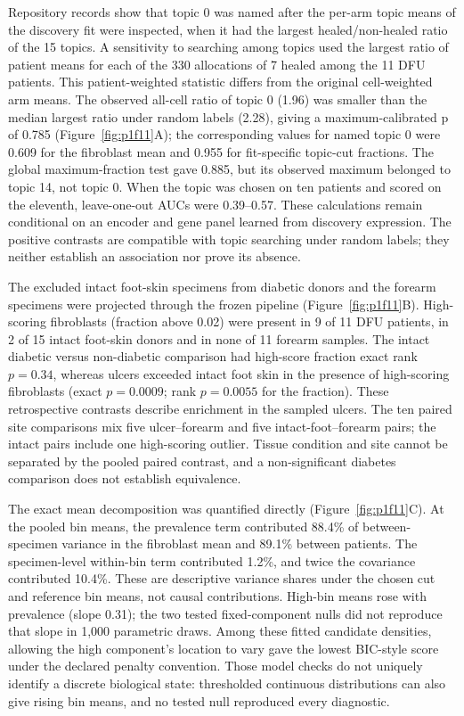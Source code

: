 \documentclass[10pt,a4paper]{article}
\begin{document}
Repository records show that topic 0 was named after the per-arm topic means of the discovery fit were inspected, when it had the largest healed/non-healed ratio of the 15 topics. A sensitivity to searching among topics used the largest ratio of patient means for each of the 330 allocations of 7 healed among the 11 DFU patients. This patient-weighted statistic differs from the original cell-weighted arm means. The observed all-cell ratio of topic 0 (1.96) was smaller than the median largest ratio under random labels (2.28), giving a maximum-calibrated p of 0.785 (Figure~\ref{fig:p1f11}A\label{call:p1f11}); the corresponding values for named topic 0 were 0.609 for the fibroblast mean and 0.955 for fit-specific topic-cut fractions. The global maximum-fraction test gave 0.885, but its observed maximum belonged to topic 14, not topic 0. When the topic was chosen on ten patients and scored on the eleventh, leave-one-out AUCs were 0.39--0.57. These calculations remain conditional on an encoder and gene panel learned from discovery expression. The positive contrasts are compatible with topic searching under random labels; they neither establish an association nor prove its absence.

The excluded intact foot-skin specimens from diabetic donors and the forearm specimens were projected through the frozen pipeline (Figure~\ref{fig:p1f11}B). High-scoring fibroblasts (fraction above 0.02) were present in 9 of 11 DFU patients, in 2 of 15 intact foot-skin donors and in none of 11 forearm samples. The intact diabetic versus non-diabetic comparison had high-score fraction exact rank $p=0.34$, whereas ulcers exceeded intact foot skin in the presence of high-scoring fibroblasts (exact $p=0.0009$; rank $p=0.0055$ for the fraction). These retrospective contrasts describe enrichment in the sampled ulcers. The ten paired site comparisons mix five ulcer--forearm and five intact-foot--forearm pairs; the intact pairs include one high-scoring outlier. Tissue condition and site cannot be separated by the pooled paired contrast, and a non-significant diabetes comparison does not establish equivalence.

The exact mean decomposition was quantified directly (Figure~\ref{fig:p1f11}C). At the pooled bin means, the prevalence term contributed 88.4\% of between-specimen variance in the fibroblast mean and 89.1\% between patients. The specimen-level within-bin term contributed 1.2\%, and twice the covariance contributed 10.4\%. These are descriptive variance shares under the chosen cut and reference bin means, not causal contributions. High-bin means rose with prevalence (slope 0.31); the two tested fixed-component nulls did not reproduce that slope in 1,000 parametric draws. Among these fitted candidate densities, allowing the high component's location to vary gave the lowest BIC-style score under the declared penalty convention. Those model checks do not uniquely identify a discrete biological state: thresholded continuous distributions can also give rising bin means, and no tested null reproduced every diagnostic.
\end{document}
